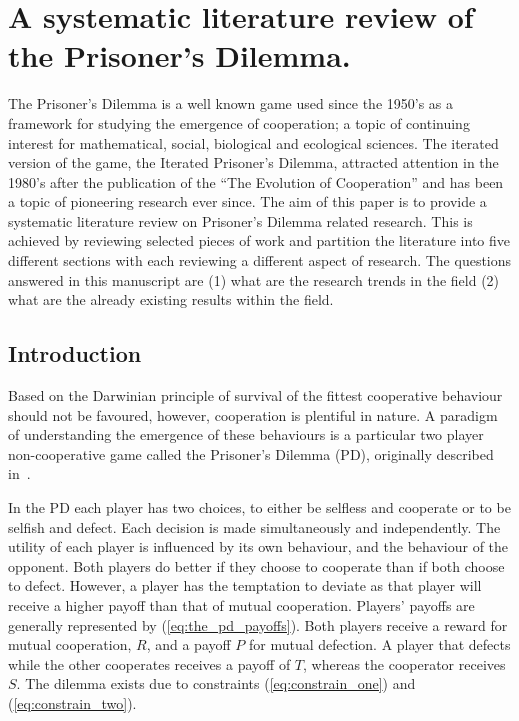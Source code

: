 \chapter{A systematic literature review of the Prisoner's Dilemma.}

    The Prisoner's Dilemma is a well known game used since the 1950's as a
    framework for studying the emergence of cooperation; a topic of continuing
    interest for mathematical, social, biological and ecological sciences. The
    iterated version of the game, the Iterated Prisoner's Dilemma, attracted
    attention in the 1980's after the publication of the ``The Evolution of
    Cooperation'' and has been a topic of pioneering research ever since. The
    aim of this paper is to provide a systematic literature review on Prisoner's
    Dilemma related research. This is achieved by reviewing selected pieces of
    work and partition the literature into five different sections with each
    reviewing a different aspect of research. The questions answered in this
    manuscript are (1) what are the research trends in the field (2) what are
    the already existing results within the field.

\section{Introduction}\label{section:introduction}

Based on the Darwinian principle of survival of the fittest cooperative behaviour
should not be favoured, however, cooperation is plentiful in nature.
A paradigm of understanding the emergence of these behaviours is
a particular two player non-cooperative game called the Prisoner's Dilemma (PD),
originally described in~\cite{Flood1958}.

In the PD each player has two choices, to either be selfless and cooperate or to
be selfish and defect. Each decision is made simultaneously and
independently. The utility of each player is influenced by its own behaviour,
and the behaviour of the opponent. Both players do better if they choose to
cooperate than if both choose to defect. However, a player has the temptation to
deviate as that player will receive a higher payoff than that of mutual
cooperation.
Players' payoffs are generally represented by (\ref{eq:the_pd_payoffs}). Both
players receive a reward for mutual cooperation, \(R\), and a payoff \(P\) for
mutual defection. A player that defects while the other cooperates receives a payoff of
\(T\), whereas the cooperator receives \(S\). The dilemma exists due
to constraints (\ref{eq:constrain_one}) and (\ref{eq:constrain_two}).

